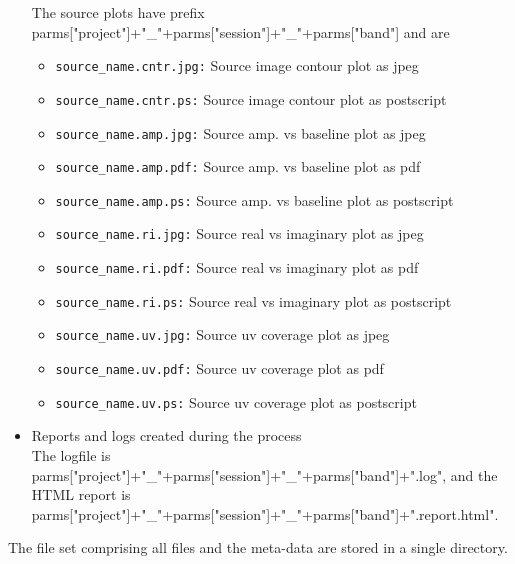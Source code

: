 \documentclass[11pt]{article}
\begin{document}
\begin{itemize}
The source plots have prefix
parms["project"]+"\_"+parms["session"]+"\_"+parms["band"] and are
\begin{itemize}
\item{\tt source\_name.cntr.jpg:} Source image contour plot as jpeg
\item{\tt source\_name.cntr.ps:} Source image contour plot as postscript
\item{\tt source\_name.amp.jpg:} Source amp. vs baseline plot as jpeg
\item{\tt source\_name.amp.pdf:} Source amp. vs baseline plot as pdf
\item{\tt source\_name.amp.ps:} Source amp. vs baseline plot as postscript
\item{\tt source\_name.ri.jpg:} Source real vs imaginary plot as jpeg
\item{\tt source\_name.ri.pdf:} Source real vs imaginary plot as pdf
\item{\tt source\_name.ri.ps:} Source real vs imaginary plot as postscript
\item{\tt source\_name.uv.jpg:} Source uv coverage plot as jpeg
\item{\tt source\_name.uv.pdf:} Source uv coverage plot as pdf
\item{\tt source\_name.uv.ps:} Source uv coverage plot as postscript
\end{itemize}
\item Reports and logs created during the process\\
The logfile is\\
parms["project"]+"\_"+parms["session"]+"\_"+parms["band"]+".log",
and the HTML report is\\
parms["project"]+"\_"+parms["session"]+"\_"+parms["band"]+".report.html".
\end{itemize}

The file set comprising all files and the meta-data are stored in a single
directory.  


\clearpage
\end{document}

